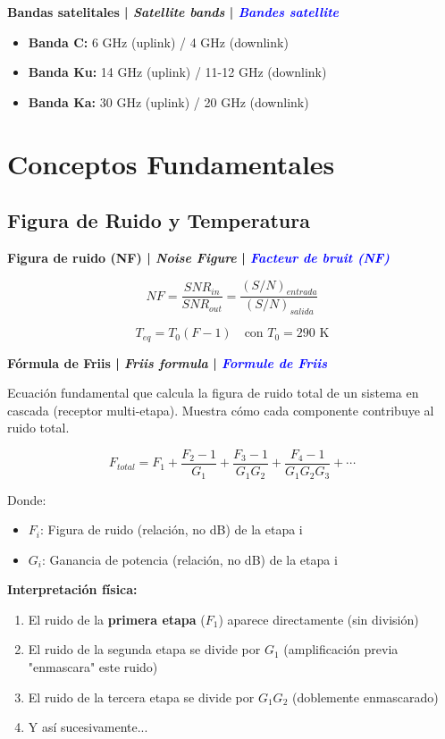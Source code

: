 \documentclass[a4paper,10pt]{article}
\begin{document}
\textbf{Bandas satelitales | \textit{Satellite bands} | \textcolor{blue}{\textit{Bandes satellite}}}

\begin{itemize}[leftmargin=*]
    \item \textbf{Banda C:} 6 GHz (uplink) / 4 GHz (downlink)
    \item \textbf{Banda Ku:} 14 GHz (uplink) / 11-12 GHz (downlink)
    \item \textbf{Banda Ka:} 30 GHz (uplink) / 20 GHz (downlink)
\end{itemize}

\section{Conceptos Fundamentales}

\subsection{Figura de Ruido y Temperatura}

\textbf{Figura de ruido (NF) | \textit{Noise Figure} | \textcolor{blue}{\textit{Facteur de bruit (NF)}}}

$$NF = \frac{SNR_{in}}{SNR_{out}} = \frac{(S/N)_{entrada}}{(S/N)_{salida}}$$

$$T_{eq} = T_0(F-1) \quad \text{con } T_0 = 290 \text{ K}$$

\textbf{F\'ormula de Friis | \textit{Friis formula} | \textcolor{blue}{\textit{Formule de Friis}}}

Ecuaci\'on fundamental que calcula la figura de ruido total de un sistema en cascada (receptor multi-etapa). Muestra c\'omo cada componente contribuye al ruido total.

$$F_{total} = F_1 + \frac{F_2-1}{G_1} + \frac{F_3-1}{G_1G_2} + \frac{F_4-1}{G_1G_2G_3} + \cdots$$

Donde:
\begin{itemize}[leftmargin=*]
    \item $F_i$: Figura de ruido (relaci\'on, no dB) de la etapa i
    \item $G_i$: Ganancia de potencia (relaci\'on, no dB) de la etapa i
\end{itemize}

\textbf{Interpretaci\'on f\'isica:}
\begin{enumerate}
    \item El ruido de la \textbf{primera etapa} ($F_1$) aparece directamente (sin divisi\'on)
    \item El ruido de la segunda etapa se divide por $G_1$ (amplificaci\'on previa "enmascara" este ruido)
    \item El ruido de la tercera etapa se divide por $G_1G_2$ (doblemente enmascarado)
    \item Y as\'i sucesivamente...
\end{enumerate}
\end{document}
